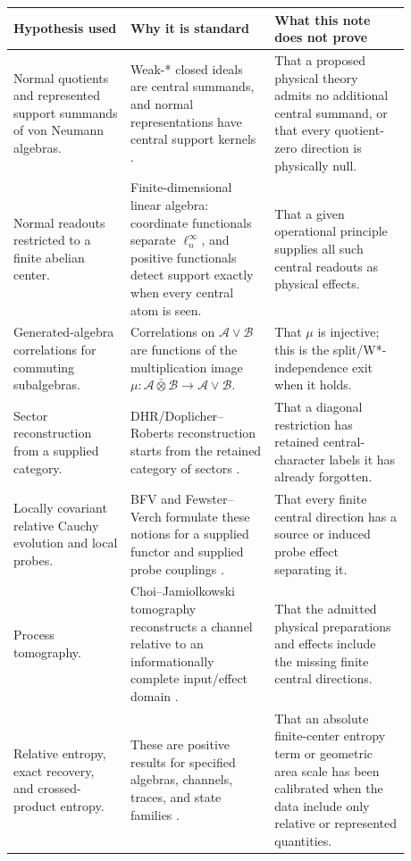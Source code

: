 \documentclass[12pt]{article}
\theoremstyle{definition}
\theoremstyle{remark}
\newcommand{\A}{\mathcal A}
\newcommand{\B}{\mathcal B}
\begin{document}
\begin{longtable}{>{\raggedright\arraybackslash}p{0.26\linewidth}
                  >{\raggedright\arraybackslash}p{0.32\linewidth}
                  >{\raggedright\arraybackslash}p{0.30\linewidth}}
\toprule
Hypothesis used & Why it is standard & What this note does not prove \\
\midrule
Normal quotients and represented support summands of von Neumann algebras. &
Weak-* closed ideals are central summands, and normal representations have
central support kernels \cite{Sakai,TakesakiI}. & That a proposed physical
theory admits no additional central summand, or that every quotient-zero
direction is physically null. \\
Normal readouts restricted to a finite abelian center. & Finite-dimensional
linear algebra: coordinate functionals separate
\(\ell^\infty_n\), and positive functionals detect support exactly when every
central atom is seen. & That a given operational principle supplies all such
central readouts as physical effects. \\
Generated-algebra correlations for commuting subalgebras. & Correlations on
\(\A\vee\B\) are functions of the multiplication image
\(\mu:\A\bar\otimes\B\to\A\vee\B\). & That \(\mu\) is injective; this is the
split/W*-independence exit when it holds. \\
Sector reconstruction from a supplied category. & DHR/Doplicher--Roberts
reconstruction starts from the retained category of sectors
\cite{DHR1,DHR2,DRDuality,DR}. & That a diagonal restriction has retained
central-character labels it has already forgotten. \\
Locally covariant relative Cauchy evolution and local probes. & BFV and
Fewster--Verch formulate these notions for a supplied functor and supplied
probe couplings \cite{BFV,FewsterVerch,FewsterVerchMeasurements}. & That every
finite central direction has a source or induced probe effect separating it. \\
Process tomography. & Choi--Jamiolkowski tomography reconstructs a channel
relative to an informationally complete input/effect domain
\cite{Jamiolkowski,Choi,ChuangNielsenProcess}. & That the admitted physical
preparations and effects include the missing finite central directions. \\
Relative entropy, exact recovery, and crossed-product entropy. & These are
positive results for specified algebras, channels, traces, and state families
\cite{ArakiRelativeEntropy,Petz,JLMS,HarlowRT,DHW,WittenCrossed,LongoWitten,
CLPW,CPW}. & That an absolute finite-center entropy term or geometric area
scale has been calibrated when the data include only relative or represented
quantities. \\
\bottomrule
\end{longtable}
\end{document}
